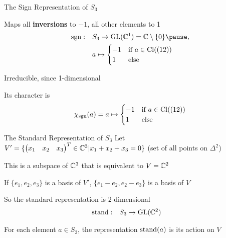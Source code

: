 \begin{frame}{The Sign Representation of $S_3$}
    \large
    
    Maps all \textbf{inversions} to $-1$, all other elements to 1
    \pause
    \begin{align*}
        \sgn: \quad & S_3 \to \GL(\C^1) = \C \setminus \{0\} \pause , \\
        & a \mapsto \begin{cases}
            -1 & \text{if } a \in \Cl((12)) \\
            1 & \text{else}
        \end{cases}
    \end{align*}

    \pause
    Irreducible, since 1-dimensional
    
    \pause
    Its character is
    \begin{align*}
        \chi_{\operatorname{sgn}}(a) = a \mapsto \begin{cases}
            -1 & \text{if } a \in \operatorname{Cl}((12)) \\
            1 & \text{else}
        \end{cases}
    \end{align*}
\end{frame}

\begin{frame}{The Standard Representation of $S_3$}
    \large
    Let $V' = \{\begin{pmatrix}
        x_1 & x_2 & x_3
    \end{pmatrix}^T \in \mathbb{C}^3 | x_1 + x_2 + x_3 = 0\}$
    (set of all points on $\Delta^2$)
    
    \pause
    This is a subspace of $\mathbb{C}^3$ that is equivalent to $V = \mathbb{C}^2$

    \pause
    If $\{e_1, e_2, e_3\}$ is a basis of $V'$,
    $\{e_1 - e_2, e_2 - e_3\}$ is a basis of $V$
    
    \vspace{1em}
    \pause
    So the standard representation is 2-dimensional
    \begin{align*}
        \operatorname{stand}: \quad & S_3 \to \operatorname{GL}(\mathbb{C}^2)
    \end{align*}
    
    \pause
    For each element $a \in S_3$, the representation $\operatorname{stand}(a)$ is its action on $V$
\end{frame}


